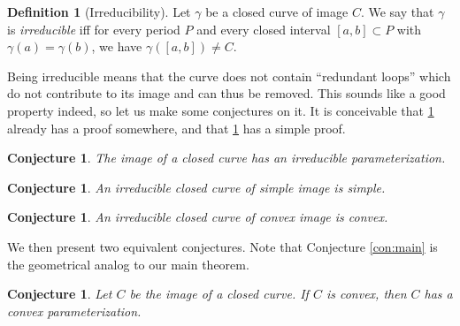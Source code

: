 \documentclass{amsart}
\newtheorem{conjecture}[proposition]{Conjecture}
\theoremstyle{definition}
\newtheorem{definition}[proposition]{Definition}
\theoremstyle{remark}
\begin{document}
\begin{definition}[Irreducibility]
    Let $\gamma$ be a closed curve of image $C$.
    We say that $\gamma$ is \emph{irreducible} iff for every period
    $P$ and every closed interval $[a,b]\subset P$
    with $\gamma(a)=\gamma(b)$, we have
    $\gamma([a,b])\ne C$.
\end{definition}

Being irreducible means that the curve does not contain
``redundant loops'' which do not contribute to its image
and can thus be removed.
This sounds like a good property indeed,
so let us make some conjectures on it.
It is conceivable that
\ref{con:irr_exists} already has a proof somewhere,
and that \ref{con:irr_simple} has a simple proof.

\begin{conjecture}
    \label{con:irr_exists}
    The image of a closed curve has an irreducible parameterization.
\end{conjecture}

\begin{conjecture}
    \label{con:irr_simple}
    An irreducible closed curve of simple image is simple.
\end{conjecture}

\begin{conjecture}
    \label{con:irr_convex}
    An irreducible closed curve of convex image is convex.
\end{conjecture}


We then present two equivalent conjectures.
Note that Conjecture \ref{con:main} is the geometrical analog to
our main theorem.

\begin{conjecture}
    \label{con:convex}
    Let $C$ be the image of a closed curve. If $C$ is convex,
    then $C$ has a convex parameterization.
\end{conjecture}
\end{document}
